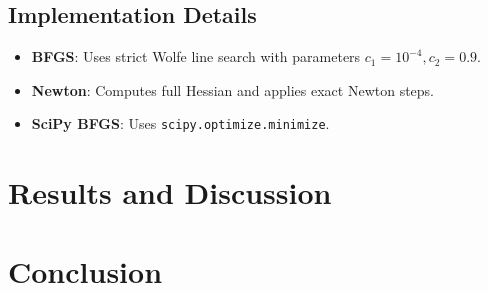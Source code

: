 \documentclass[12pt]{article}
\begin{document}
\subsection{Implementation Details}
\begin{itemize}
    \item \textbf{BFGS}: Uses strict Wolfe line search with parameters \( c_1 = 10^{-4}, c_2 = 0.9 \).
    \item \textbf{Newton}: Computes full Hessian and applies exact Newton steps.
    \item \textbf{SciPy BFGS}: Uses \texttt{scipy.optimize.minimize}.
\end{itemize}


\section{Results and Discussion}


\section{Conclusion}

\end{document}
